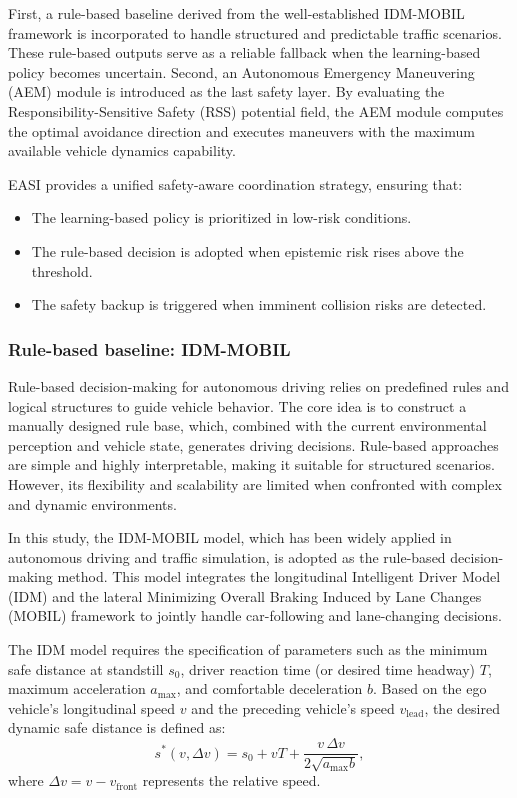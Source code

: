 \documentclass[preprint,12pt,authoryear]{elsarticle}
\begin{document}
First, a rule-based baseline derived from the well-established IDM-MOBIL framework is incorporated to handle structured and predictable traffic scenarios. These rule-based outputs serve as a reliable fallback when the learning-based policy becomes uncertain.
Second, an Autonomous Emergency Maneuvering (AEM) module is introduced as the last safety layer. By evaluating the Responsibility-Sensitive Safety (RSS) potential field, the AEM module computes the optimal avoidance direction and executes maneuvers with the maximum available vehicle dynamics capability.

EASI provides a unified safety-aware coordination strategy, ensuring that:

\begin{itemize}
    \item The learning-based policy is prioritized in low-risk conditions.
    \item The rule-based decision is adopted when epistemic risk rises above the threshold.
    \item The safety backup is triggered when imminent collision risks are detected.
\end{itemize}

\subsubsection{Rule-based baseline: IDM-MOBIL}

Rule-based decision-making for autonomous driving relies on predefined rules and logical structures to guide vehicle behavior. The core idea is to construct a manually designed rule base, which, combined with the current environmental perception and vehicle state, generates driving decisions. Rule-based approaches are simple and highly interpretable, making it suitable for structured scenarios. However, its flexibility and scalability are limited when confronted with complex and dynamic environments.

In this study, the IDM-MOBIL model, which has been widely applied in autonomous driving and traffic simulation, is adopted as the rule-based decision-making method. This model integrates the longitudinal Intelligent Driver Model (IDM) and the lateral Minimizing Overall Braking Induced by Lane Changes (MOBIL) framework to jointly handle car-following and lane-changing decisions.

The IDM model requires the specification of parameters such as the minimum safe distance at standstill $s_0$, driver reaction time (or desired time headway) $T$, maximum acceleration $a_{\max}$, and comfortable deceleration $b$. Based on the ego vehicle’s longitudinal speed $v$ and the preceding vehicle’s speed $v_{\text{lead}}$, the desired dynamic safe distance is defined as:
\begin{equation}
s^{*}(v, \Delta v) = s_0 + vT + \frac{v \, \Delta v}{2\sqrt{a_{\max} b}}, 
\label{eq4_4}
\end{equation}
where $\Delta v = v - v_{\text{front}}$ represents the relative speed.
\end{document}
